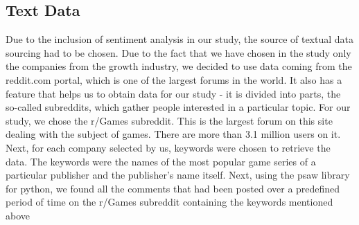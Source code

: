 \documentclass[11pt]{article} %
\begin{document}
\clearpage

\subsection{Text Data}
Due to the inclusion of sentiment analysis in our study, the source of textual data sourcing had to be chosen. Due to the fact that we have chosen in the study only the companies from the growth industry, we decided to use data coming from the reddit.com portal, which is one of the largest forums in the world. It also has a feature that helps us to obtain data for our study - it is divided into parts, the so-called subreddits, which gather people interested in a particular topic. For our study, we chose the r/Games subreddit. This is the largest forum on this site dealing with the subject of games. There are more than 3.1 million users on it. Next, for each company selected by us, keywords were chosen to retrieve the data. The keywords were the names of the most popular game series of a particular publisher and the publisher's name itself. Next, using the psaw library for python, we found all the comments that had been posted over a predefined period of time on the r/Games subreddit containing the keywords mentioned above 
\end{document}
